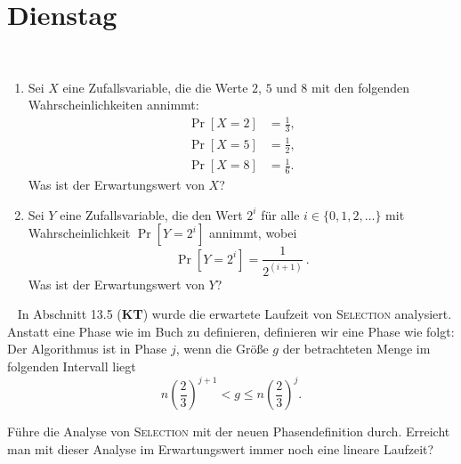 \documentclass{uebung_cs}
\begin{document}
\section*{Dienstag}

\begin{exercise}[Erwartungswerte]\
	\begin{enumerate}
		\item Sei $X$ eine Zufallsvariable, die die Werte $2$, $5$ und $8$ mit den folgenden Wahrscheinlichkeiten annimmt:
		\begin{align*}
			\Pr[X=2] &= \tfrac{1}{3},\\
			\Pr[X=5] &= \tfrac{1}{2},\\
			\Pr[X=8] &= \tfrac{1}{6}.
		\end{align*}
		Was ist der Erwartungswert von $X$?\\
		
		\item Sei $Y$ eine Zufallsvariable, die den Wert $2^i$ für alle $i \in \{0,1,2,\dots\}$ mit Wahrscheinlichkeit $\Pr[Y=2^i]$ annimmt, wobei \[\Pr[Y=2^i]= \frac{1}{2^{(i+1)}}\,.\]
		Was ist der Erwartungswert von $Y$?
	\end{enumerate}	
\end{exercise}


\begin{exercise}\
	In Abschnitt 13.5 (\textbf{KT}) wurde die erwartete Laufzeit von \textsc{Selection} analysiert.
	Anstatt eine Phase wie im Buch zu definieren, definieren wir eine Phase wie folgt:
	Der Algorithmus ist in Phase $j$, wenn die Größe $g$ der betrachteten Menge im folgenden Intervall liegt
	\[n\left(\frac{2}{3}\right)^{j+1} < g \leq n\left(\frac{2}{3}\right)^j. \]
	
	Führe die Analyse von \textsc{Selection} mit der neuen Phasendefinition durch. Erreicht man mit dieser Analyse im Erwartungswert immer noch eine lineare Laufzeit?
\end{exercise}    
\end{document}
